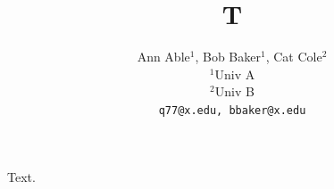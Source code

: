 \documentclass{article}
\title{T}
\author{Ann Able$^1$, Bob Baker$^1$, Cat Cole$^2$ \\ $^1$Univ A \\ $^2$Univ B \\ \texttt{q77@x.edu, bbaker@x.edu}}
\begin{document}
\maketitle
Text.
\end{document}
